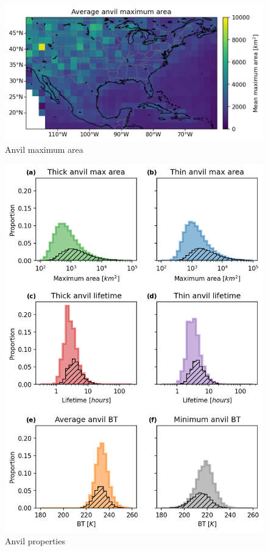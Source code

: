 \begin{figure}[tp]
    \centering
    \includegraphics[width=\textwidth]{figures/ch2_17.png}
    \caption{Anvil maximum area}
    \label{fig:anvil_area_map}
\end{figure}

\begin{figure}[tp]
    \centering
    \includegraphics[width=\textwidth]{figures/ch2_18.png}
    \caption{Anvil properties}
    \label{fig:anvil_properties}
\end{figure}

